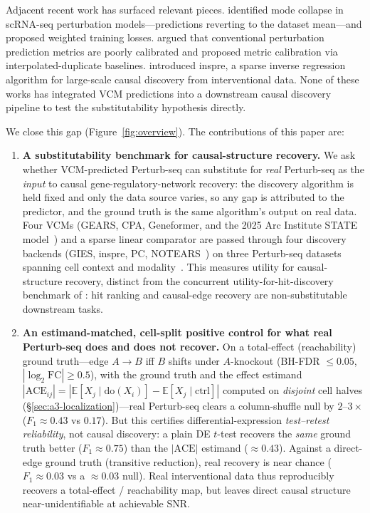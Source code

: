 \documentclass{article}
\theoremstyle{plain}
\theoremstyle{definition}
\theoremstyle{remark}
\begin{document}
Adjacent recent work has surfaced relevant pieces. \citet{mejia2025diversity} identified mode collapse in scRNA-seq perturbation models---predictions reverting to the dataset mean---and proposed weighted training losses. \citet{miller2025calibrated} argued that conventional perturbation prediction metrics are poorly calibrated and proposed metric calibration via interpolated-duplicate baselines. \citet{brown2025inspre} introduced inspre, a sparse inverse regression algorithm for large-scale causal discovery from interventional data. None of these works has integrated VCM predictions into a downstream causal discovery pipeline to test the substitutability hypothesis directly.

We close this gap (Figure~\ref{fig:overview}). The contributions of this paper are:
\begin{enumerate}
\item \textbf{A substitutability benchmark for causal-structure recovery.} We ask whether VCM-predicted Perturb-seq can substitute for \emph{real} Perturb-seq as the \emph{input} to causal gene-regulatory-network recovery: the discovery algorithm is held fixed and only the data source varies, so any gap is attributed to the predictor, and the ground truth is the same algorithm's output on real data. Four VCMs (GEARS, CPA, Geneformer, and the 2025 Arc Institute STATE model~\citep{roohani2024gears,lotfollahi2023cpa,theodoris2023geneformer,adduri2025state}) and a sparse linear comparator are passed through four discovery backends (GIES, inspre, PC, NOTEARS~\citep{hauser2012gies,brown2025inspre}) on three Perturb-seq datasets spanning cell context and modality~\citep{replogle2022,norman2019}. This measures utility for causal-structure recovery, distinct from the concurrent utility-for-hit-discovery benchmark of \citet{bereket2026perturbhd}: hit ranking and causal-edge recovery are non-substitutable downstream tasks.

\item \textbf{An estimand-matched, cell-split positive control for what real Perturb-seq does and does not recover.} On a total-effect (reachability) ground truth---edge $A\!\to\!B$ iff $B$ shifts under $A$-knockout (BH-FDR $\le 0.05$, $|\log_2\mathrm{FC}|\ge 0.5$), with the ground truth and the effect estimand $|\mathrm{ACE}_{ij}|=|\mathbb{E}[X_j\mid\mathrm{do}(X_i)]-\mathbb{E}[X_j\mid\mathrm{ctrl}]|$ computed on \emph{disjoint} cell halves (\S\ref{sec:a3-localization})---real Perturb-seq clears a column-shuffle null by $2$--$3\times$ ($F_1\approx0.43$ vs $0.17$). But this certifies differential-expression \emph{test--retest reliability}, not causal discovery: a plain DE $t$-test recovers the \emph{same} ground truth better ($F_1\approx0.75$) than the $|\mathrm{ACE}|$ estimand ($\approx0.43$). Against a direct-edge ground truth (transitive reduction), real recovery is near chance ($F_1\approx0.03$ vs a $\approx0.03$ null). Real interventional data thus reproducibly recovers a total-effect / reachability map, but leaves direct causal structure near-unidentifiable at achievable SNR.


\end{enumerate}
\end{document}

